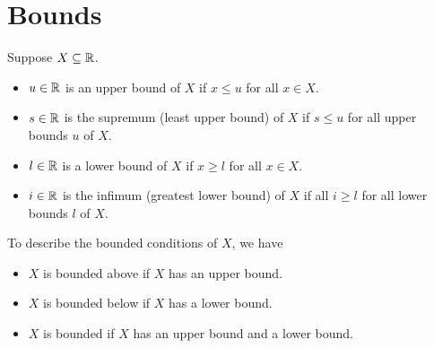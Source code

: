 
\section{Bounds}
Suppose $X \subseteq \mathbb{R}$.
\begin{itemize}
  \item $u \in \mathbb{R}$ is an upper bound of $X$ if $x \leq u$ for all $x \in X$.
  \item $s \in \mathbb{R}$ is the supremum (least upper bound) of $X$ if $s \leq u$ for all upper bounds $u$ of $X$.
  \item $l \in \mathbb{R}$ is a lower bound of $X$ if $x \geq l$ for all $x \in X$.
  \item $i \in \mathbb{R}$ is the infimum (greatest lower bound) of $X$ if all $i \geq l$ for all lower bounds $l$ of $X$.
\end{itemize}

To describe the bounded conditions of $X$, we have
\begin{itemize}
  \item $X$ is bounded above if $X$ has an upper bound.
  \item $X$ is bounded below if $X$ has a lower bound.
  \item $X$ is bounded if $X$ has an upper bound and a lower bound.
\end{itemize}


